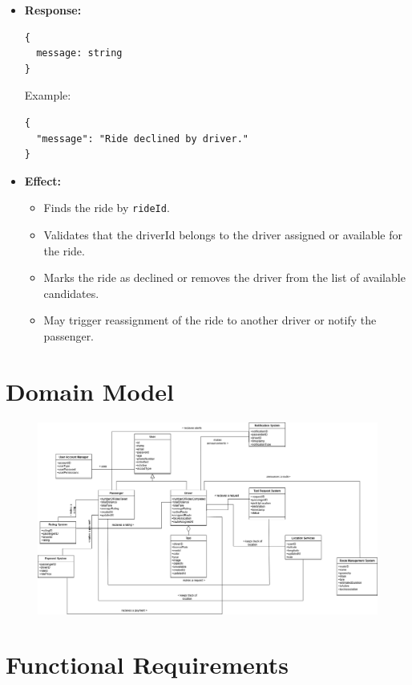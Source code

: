 \documentclass[a4paper,12pt]{article}
\begin{document}
\begin{enumerate}
\begin{itemize}
    \item \textbf{Response:}
    \begin{verbatim}
{
  message: string
}
    \end{verbatim}
    Example:
    \begin{verbatim}
{
  "message": "Ride declined by driver."
}
    \end{verbatim}
    
    \item \textbf{Effect:}
    \begin{itemize}
      \item Finds the ride by \texttt{rideId}.
      \item Validates that the driverId belongs to the driver assigned or available for the ride.
      \item Marks the ride as declined or removes the driver from the list of available candidates.
      \item May trigger reassignment of the ride to another driver or notify the passenger.
    \end{itemize}
  \end{itemize}
\end{enumerate}

\section{Domain Model}

\begin{figure}[H]
  \centering
  \includegraphics[width=1\textwidth]{Domain_Model_TaxiTap-Page.png} 
\end{figure}

\section{Functional Requirements}
\end{document}
